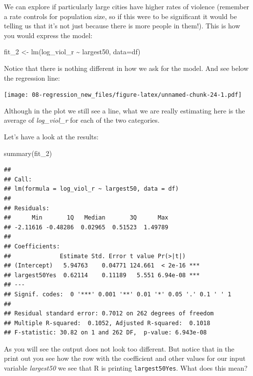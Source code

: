 \documentclass[
]{book}
\newenvironment{Shaded}{\begin{snugshade}}{\end{snugshade}}
\newcommand{\AttributeTok}[1]{\textcolor[rgb]{0.77,0.63,0.00}{#1}}
\newcommand{\FunctionTok}[1]{\textcolor[rgb]{0.00,0.00,0.00}{#1}}
\newcommand{\NormalTok}[1]{#1}
\newcommand{\OtherTok}[1]{\textcolor[rgb]{0.56,0.35,0.01}{#1}}
\newcommand{\SpecialCharTok}[1]{\textcolor[rgb]{0.00,0.00,0.00}{#1}}
\begin{document}
We can explore if particularly large cities have higher rates of violence (remember a rate controls for population size, so if this were to be significant it would be telling us that it's not just because there is more people in them!). This is how you would express the model:

\begin{Shaded}
\begin{Highlighting}[]
\NormalTok{fit\_2 }\OtherTok{\textless{}{-}} \FunctionTok{lm}\NormalTok{(log\_viol\_r }\SpecialCharTok{\textasciitilde{}}\NormalTok{ largest50, }\AttributeTok{data=}\NormalTok{df)}
\end{Highlighting}
\end{Shaded}

Notice that there is nothing different in how we ask for the model. And see below the regression line:

\texttt{[image: 08-regression\_new\_files/figure-latex/unnamed-chunk-24-1.pdf]}

Although in the plot we still see a line, what we are really estimating here is the average of \emph{log\_viol\_r} for each of the two categories.

Let's have a look at the results:

\begin{Shaded}
\begin{Highlighting}[]
\FunctionTok{summary}\NormalTok{(fit\_2)}
\end{Highlighting}
\end{Shaded}

\begin{verbatim}
## 
## Call:
## lm(formula = log_viol_r ~ largest50, data = df)
## 
## Residuals:
##      Min       1Q   Median       3Q      Max 
## -2.11616 -0.48286  0.02965  0.51523  1.49789 
## 
## Coefficients:
##              Estimate Std. Error t value Pr(>|t|)    
## (Intercept)   5.94763    0.04771 124.661  < 2e-16 ***
## largest50Yes  0.62114    0.11189   5.551 6.94e-08 ***
## ---
## Signif. codes:  0 '***' 0.001 '**' 0.01 '*' 0.05 '.' 0.1 ' ' 1
## 
## Residual standard error: 0.7012 on 262 degrees of freedom
## Multiple R-squared:  0.1052, Adjusted R-squared:  0.1018 
## F-statistic: 30.82 on 1 and 262 DF,  p-value: 6.943e-08
\end{verbatim}

As you will see the output does not look too different. But notice that in the print out you see how the row with the coefficient and other values for our input variable \emph{largest50} we see that R is printing \texttt{largest50Yes}. What does this mean?
\end{document}
